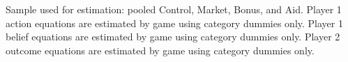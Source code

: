 \begin{flushleft}
\footnotesize Sample used for estimation: pooled Control, Market, Bonus, and Aid. Player 1 action equations are estimated by game using category dummies only. Player 1 belief equations are estimated by game using category dummies only. Player 2 outcome equations are estimated by game using category dummies only.
\end{flushleft}
